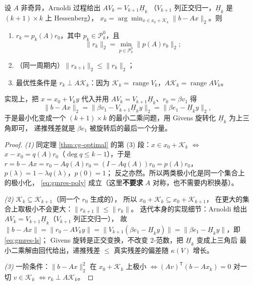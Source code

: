 \begin{theorem}
\label{thm:gmres}
设 $A$ 非奇异，Arnoldi 过程给出 $AV_k=V_{k+1}\underline H_k$
（$V_{k+1}$ 列正交归一，$\underline H_k$ 是 $(k+1)\times k$ 上 Hessenberg），
$x_k=\arg\min_{x\in x_0+\mathcal K_k}\|b-Ax\|_2$。则
\begin{enumerate}
  \item $r_k=p_k(A)r_0$，其中 $p_k\in\mathcal P_k^0$，且
        \begin{equation}
          \|r_k\|_2=\min_{p\in\mathcal P_k^0}\|p(A)r_0\|_2 ;
          \label{eq:gmres-poly}
        \end{equation}
  \item （同一周期内）$\|r_{k+1}\|_2\le\|r_k\|_2$；
  \item 最优性条件是 $r_k\perp A\mathcal K_k$：因为
        $\mathcal K_k=\operatorname{range}V_k$，$A\mathcal K_k=\operatorname{range}AV_k$。
\end{enumerate}
实现上，把 $x=x_0+V_ky$ 代入并用 $AV_k=V_{k+1}\underline H_k$、$r_0=\beta v_1$ 得
\begin{equation}
  \|b-Ax\|_2=\|\beta v_1-V_{k+1}\underline H_ky\|_2
  =\bigl\|\beta e_1-\underline H_ky\bigr\|_2 ,
  \label{eq:gmres-ls}
\end{equation}
于是最小化变成一个 $(k+1)\times k$ 的最小二乘问题，用 Givens 旋转化 $\underline H_k$ 为上三角即可，
递推残差就是 $\beta e_1$ 被旋转后的最后一个分量。
\end{theorem}

\begin{proof}
\emph{(1)} 同定理 \ref{thm:cg-optimal} 的第 (3) 段：$x\in x_0+\mathcal K_k$ $\iff$
$x-x_0=q(A)r_0$（$\deg q\le k-1$），于是
$r=b-Ax=r_0-Aq(A)r_0=(I-Aq(A))r_0=p(A)r_0$，$p(\lambda)=1-\lambda q(\lambda)$，$p(0)=1$；
反之亦然。所以两类极小化是同一个集合上的极小化，
\eqref{eq:gmres-poly} 成立（这里\textbf{不要求} $A$ 对称，也不需要内积换基）。

\emph{(2)} $\mathcal K_k\subseteq\mathcal K_{k+1}$（同一个 $r_0$ 生成的），
所以 $x_0+\mathcal K_k\subseteq x_0+\mathcal K_{k+1}$，
在更大的集合上取极小不会更大：$\|r_{k+1}\|\le\|r_k\|$。
迭代本身的实现细节：Arnoldi 给出 $AV_k=V_{k+1}\underline H_k$（$V_{k+1}$ 列正交归一），
故 $\|b-Ax\|=\|r_0-AV_ky\|=\|V_{k+1}(\beta e_1-\underline H_ky)\|
=\|\beta e_1-\underline H_ky\|$，即 \eqref{eq:gmres-ls}；
Givens 旋转是正交变换，不改变 2-范数，把 $\underline H_k$ 变成上三角后
最小二乘解由回代给出，递推残差 $\le$ 真实残差的偏差随 $\kappa(V)$ 增长。

\emph{(3)} 一阶条件：$\|b-Ax\|_2^2$ 在 $x_0+\mathcal K_k$ 上极小
$\iff(Av)^{\mathsf T}(b-Ax_k)=0$ 对一切 $v\in\mathcal K_k$
$\iff r_k\perp A\mathcal K_k$。
\end{proof}

